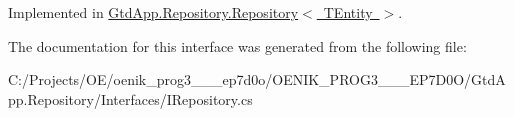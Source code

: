 Implemented in \mbox{\hyperlink{class_gtd_app_1_1_repository_1_1_repository_a5e3d1bdfdf567227d337af334954cf45}{Gtd\+App.\+Repository.\+Repository$<$ T\+Entity $>$}}.



The documentation for this interface was generated from the following file\+:\begin{DoxyCompactItemize}
\item 
C\+:/\+Projects/\+O\+E/oenik\+\_\+prog3\+\_\+\_\+\_\+ep7d0o/\+O\+E\+N\+I\+K\+\_\+\+P\+R\+O\+G3\+\_\+\_\+\_\+\+E\+P7\+D0\+O/\+Gtd\+App.\+Repository/\+Interfaces/I\+Repository.\+cs\end{DoxyCompactItemize}
